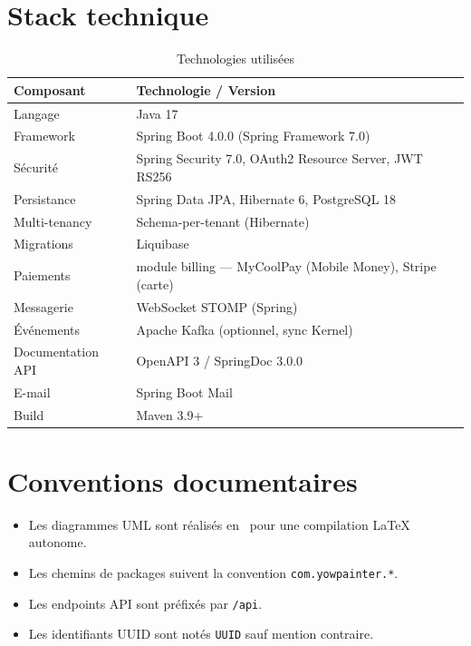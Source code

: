 \section{Stack technique}

\begin{table}[h]
  \centering
  \caption{Technologies utilisées}
  \label{tab:stack}
  \begin{tabular}{@{}ll@{}}
    \toprule
    \textbf{Composant} & \textbf{Technologie / Version} \\
    \midrule
    Langage            & Java 17 \\
    Framework          & Spring Boot 4.0.0 (Spring Framework 7.0) \\
    Sécurité           & Spring Security 7.0, OAuth2 Resource Server, JWT RS256 \\
    Persistance        & Spring Data JPA, Hibernate 6, PostgreSQL 18 \\
    Multi-tenancy      & Schema-per-tenant (Hibernate) \\
    Migrations         & Liquibase \\
    Paiements          & {} module billing — MyCoolPay (Mobile Money), Stripe (carte) \\
    Messagerie         & WebSocket STOMP (Spring) \\
    Événements         & Apache Kafka (optionnel, sync Kernel) \\
    Documentation API  & OpenAPI 3 / SpringDoc 3.0.0 \\
    E-mail             & Spring Boot Mail \\
    Build              & Maven 3.9+ \\
    \bottomrule
  \end{tabular}
\end{table}

\section{Conventions documentaires}

\begin{itemize}[noitemsep]
  \item Les diagrammes UML sont réalisés en \TikZ\ pour une compilation LaTeX autonome.
  \item Les chemins de packages suivent la convention \texttt{com.yowpainter.*}.
  \item Les endpoints API sont préfixés par \texttt{/api}.
  \item Les identifiants UUID sont notés \texttt{UUID} sauf mention contraire.
\end{itemize}

